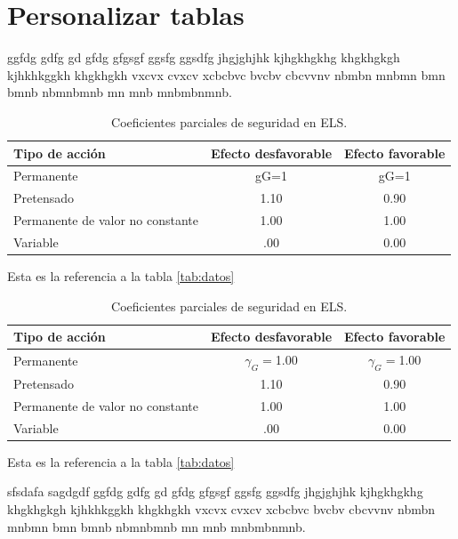 \documentclass[a4paper, 12pt]{article}
\begin{document}
	\section{Personalizar tablas}
	
	ggfdg gdfg gd gfdg gfgsgf ggsfg ggsdfg jhgjghjhk kjhgkhgkhg khgkhgkgh kjhkhkggkh khgkhgkh vxcvx cvxcv xcbcbvc bvcbv cbcvvnv nbmbn mnbmn bmn bmnb nbmnbmnb mn mnb mnbmbnmnb.
	
	\begin{table}[h]
		\centering
		\caption{Coeficientes parciales de seguridad en ELS.}
		\begin{tabular}{p{4cm}cc}
			\hline \textbf{Tipo de acción} & \textbf{Efecto desfavorable} & \textbf{Efecto favorable} \\
			\hline Permanente & gG=1 & gG=1 \\
			\hline Pretensado & 1.10 & 0.90 \\
			\hline Permanente de valor no constante & 1.00 & 1.00 \\
			\hline Variable &.00 & 0.00 \\
			\hline
		\end{tabular}
		\label{tab:coeficientes1}
	\end{table}
	
	Esta es la referencia a la tabla \ref{tab:datos}
	
	\begin{table}[h]
		\centering
		\caption{Coeficientes parciales de seguridad en ELS.}
		{\color{colorAzul1}
		\begin{tabular}{p{4cm}cc}
			\toprule %
			\hline \textbf{Tipo de acción} & \textbf{Efecto desfavorable} & \textbf{Efecto favorable} \\
			\midrule %
			Permanente & $ \gamma_G= $1.00 & $ \gamma_G= $1.00 \\
			Pretensado & 1.10 & 0.90 \\
			Permanente de valor no constante & 1.00 & 1.00 \\
			Variable &.00 & 0.00 \\
			\bottomrule %
		\end{tabular}}
		\label{tab:coeficientes2}
	\end{table}
	
	Esta es la referencia a la tabla \ref{tab:datos}
	
	
	sfsdafa sagdgdf ggfdg gdfg gd gfdg gfgsgf ggsfg ggsdfg jhgjghjhk kjhgkhgkhg khgkhgkgh kjhkhkggkh khgkhgkh vxcvx cvxcv xcbcbvc bvcbv cbcvvnv nbmbn mnbmn bmn bmnb nbmnbmnb mn mnb mnbmbnmnb.
	
\end{document}
